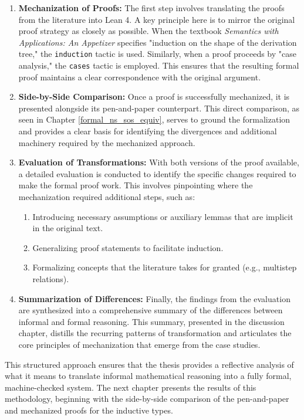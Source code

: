 \begin{enumerate}
    \item \textbf{Mechanization of Proofs:} The first step involves translating the proofs
    from the literature into Lean 4. A key principle here is to mirror the original proof
    strategy as closely as possible.
    When the textbook \emph{Semantics with Applications: An Appetizer} specifies "induction on the shape
    of the derivation tree," the \texttt{induction} tactic is used. Similarly, when a proof
    proceeds by "case analysis," the \texttt{cases} tactic is employed. This ensures that
    the resulting formal proof maintains a clear correspondence with the original argument.

    \item \textbf{Side-by-Side Comparison:} Once a proof is successfully mechanized,
    it is presented alongside its pen-and-paper counterpart. This direct comparison,
    as seen in Chapter \ref{formal_ns_sos_equiv}, serves to ground the formalization
    and provides a clear basis for identifying the divergences and additional machinery
    required by the mechanized approach.

    \item \textbf{Evaluation of Transformations:} With both versions of the proof available,
    a detailed evaluation is conducted to identify the specific changes required to make the
    formal proof work. This involves pinpointing where the mechanization required additional
    steps, such as:
    \begin{enumerate}
        \item Introducing necessary assumptions or auxiliary lemmas that are implicit in
        the original text.
        
        \item Generalizing proof statements to facilitate induction.
        
        \item Formalizing concepts that the literature takes for granted
        (e.g., multistep relations).
    \end{enumerate}

    \item \textbf{Summarization of Differences:} Finally, the findings from the evaluation
    are synthesized into a comprehensive summary of the differences between informal and
    formal reasoning. This summary, presented in the discussion chapter, distills the
    recurring patterns of transformation and articulates the core principles of mechanization
    that emerge from the case studies.
\end{enumerate}

This structured approach ensures that the thesis provides a reflective analysis
of what it means to translate informal mathematical
reasoning into a fully formal, machine-checked system.
The next chapter presents the
results of this methodology, beginning with the side-by-side comparison of the
pen-and-paper and mechanized proofs for the inductive types.